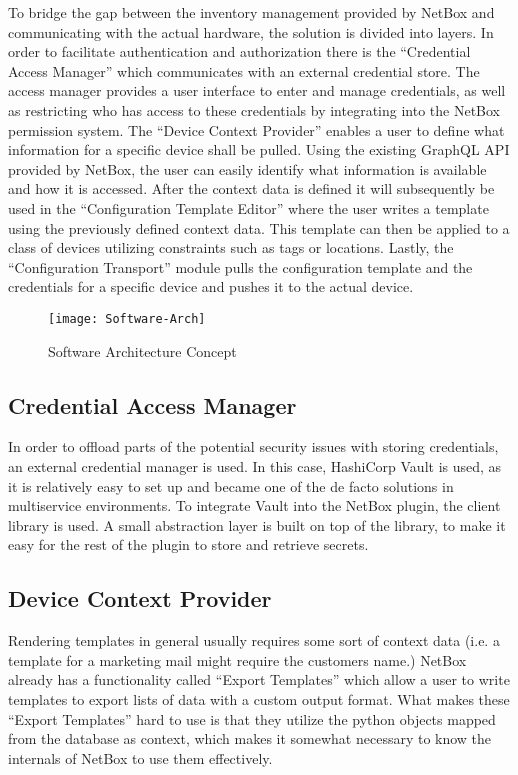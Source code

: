 To bridge the gap between the inventory management provided by NetBox and communicating with the actual hardware,
the solution is divided into layers.
In order to facilitate authentication and authorization there is the ``Credential Access Manager'' which communicates
with an external credential store. The access manager provides a user interface to enter and manage credentials, as well
as restricting who has access to these credentials by integrating into the NetBox permission system.
The ``Device Context Provider'' enables a user to define what information for a specific device shall be pulled.
Using the existing GraphQL API provided by NetBox, the user can easily identify what information is available and how it is
accessed. After the context data is defined it will subsequently be used in the ``Configuration Template Editor''
where the user writes a template using the previously defined context data. This template can then be applied to
a class of devices utilizing constraints such as tags or locations.
Lastly, the ``Configuration Transport'' module pulls the configuration template and the credentials for a specific device
and pushes it to the actual device.


\begin{figure}[h]
  \centering
  \texttt{[image: Software-Arch]}
  \caption{Software Architecture Concept}
  \label{fig:soft-arch}
\end{figure}



\subsection{Credential Access Manager}

In order to offload parts of the potential security issues with storing
credentials, an external credential manager is used.
In this case, HashiCorp Vault is used, as it is relatively easy to
set up and became one of the de facto solutions in multiservice
environments. To integrate Vault into the NetBox plugin, the client
library  is used. A small abstraction layer is built
on top of the library, to make it easy for the rest of the plugin
to store and retrieve secrets.

\subsection{Device Context Provider}

Rendering templates in general usually requires some sort of context data
(i.e. a template for a marketing mail might require the customers name.)
NetBox already has a functionality called ``Export Templates'' which
allow a user to write templates to export lists of data with a custom
output format. What makes these ``Export Templates'' hard to use is that
they utilize the python objects mapped from the database as context,
which makes it somewhat necessary to know the internals of NetBox to
use them effectively.

